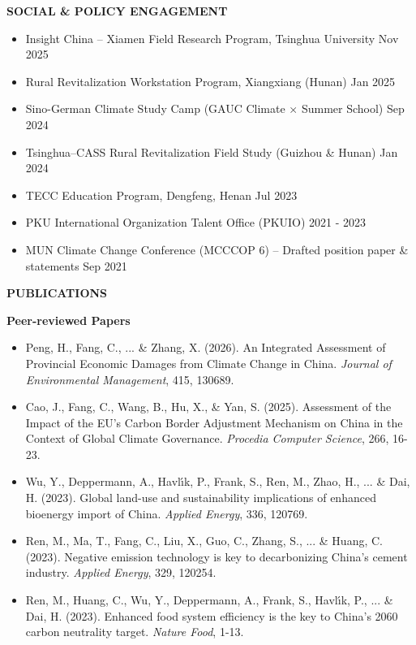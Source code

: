 \documentclass[UTF8]{ctexbook}
\begin{document}
\vspace{12pt}

\begin{center}
    \textbf{SOCIAL \& POLICY ENGAGEMENT}
\end{center}

\begin{itemize}[leftmargin=1.5em, itemsep=2pt, topsep=4pt]
    \item Insight China -- Xiamen Field Research Program, Tsinghua University \hfill Nov 2025
    \item Rural Revitalization Workstation Program, Xiangxiang (Hunan) \hfill Jan 2025
    \item Sino-German Climate Study Camp (GAUC Climate $\times$ Summer School) \hfill Sep 2024
    \item Tsinghua--CASS Rural Revitalization Field Study (Guizhou \& Hunan) \hfill Jan 2024
    \item TECC Education Program, Dengfeng, Henan \hfill Jul 2023
    \item PKU International Organization Talent Office (PKUIO) \hfill 2021 - 2023
    \item MUN Climate Change Conference (MCCCOP 6) -- Drafted position paper \& statements \hfill Sep 2021
\end{itemize}

\vspace{12pt}

\begin{center}
    \textbf{PUBLICATIONS}
\end{center}

\textbf{Peer-reviewed Papers}

\begin{itemize}[leftmargin=1.5em, itemsep=2pt, topsep=4pt]
    \item Peng, H., Fang, C., ... \& Zhang, X. (2026). An Integrated Assessment of Provincial Economic Damages from Climate Change in China. \textit{Journal of Environmental Management}, 415, 130689.
    \item Cao, J., Fang, C., Wang, B., Hu, X., \& Yan, S. (2025). Assessment of the Impact of the EU's Carbon Border Adjustment Mechanism on China in the Context of Global Climate Governance. \textit{Procedia Computer Science}, 266, 16-23.
    \item Wu, Y., Deppermann, A., Havl\'{\i}k, P., Frank, S., Ren, M., Zhao, H., ... \& Dai, H. (2023). Global land-use and sustainability implications of enhanced bioenergy import of China. \textit{Applied Energy}, 336, 120769.
    \item Ren, M., Ma, T., Fang, C., Liu, X., Guo, C., Zhang, S., ... \& Huang, C. (2023). Negative emission technology is key to decarbonizing China's cement industry. \textit{Applied Energy}, 329, 120254.
    \item Ren, M., Huang, C., Wu, Y., Deppermann, A., Frank, S., Havl\'{\i}k, P., ... \& Dai, H. (2023). Enhanced food system efficiency is the key to China's 2060 carbon neutrality target. \textit{Nature Food}, 1-13.
\end{itemize}
\end{document}
